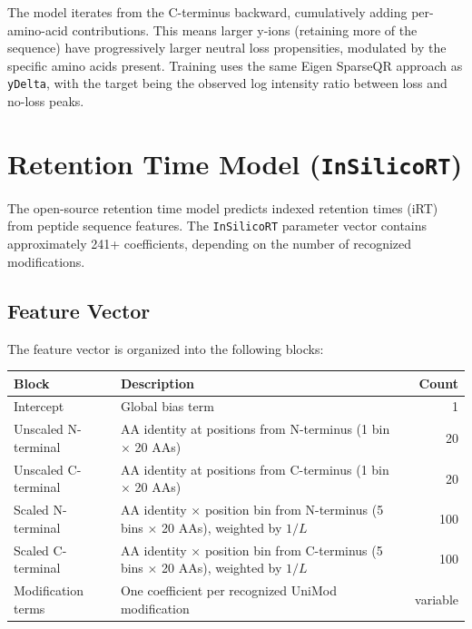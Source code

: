 \documentclass[11pt,a4paper]{article}
\begin{document}
The model iterates from the C-terminus backward, cumulatively adding per-amino-acid contributions. This means larger y-ions (retaining more of the sequence) have progressively larger neutral loss propensities, modulated by the specific amino acids present. Training uses the same Eigen SparseQR approach as \texttt{yDelta}, with the target being the observed log intensity ratio between loss and no-loss peaks.

\section{Retention Time Model (\texttt{InSilicoRT})}
\label{sec:rt}

The open-source retention time model predicts indexed retention times (iRT) from peptide sequence features. The \texttt{InSilicoRT} parameter vector contains approximately 241+ coefficients, depending on the number of recognized modifications.

\subsection{Feature Vector}

The feature vector is organized into the following blocks:

\begin{center}
\begin{tabular}{p{4cm}p{6.5cm}r}
\toprule
\textbf{Block} & \textbf{Description} & \textbf{Count} \\
\midrule
Intercept & Global bias term & 1 \\
\addlinespace
Unscaled N-terminal & AA identity at positions from N-terminus (1 bin $\times$ 20 AAs) & 20 \\
\addlinespace
Unscaled C-terminal & AA identity at positions from C-terminus (1 bin $\times$ 20 AAs) & 20 \\
\addlinespace
Scaled N-terminal & AA identity $\times$ position bin from N-terminus (5 bins $\times$ 20 AAs), weighted by $1/L$ & 100 \\
\addlinespace
Scaled C-terminal & AA identity $\times$ position bin from C-terminus (5 bins $\times$ 20 AAs), weighted by $1/L$ & 100 \\
\addlinespace
Modification terms & One coefficient per recognized UniMod modification & variable \\
\bottomrule
\end{tabular}
\end{center}
\end{document}
